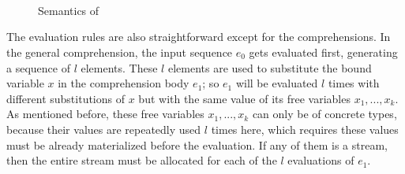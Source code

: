 \begin{figure}\large

	\\[4ex]
	\PT{
		\Axiom{\Eval{\rho}{\{\}\tau}{\{\}}}
	}\\[4ex]
	\\[4ex]
	\\[4ex]
	
	\\[4ex]	
	\\[4ex]
	\\[4ex]
	\\
\caption{Semantics of \mysnesl \label{fig:mysnesl-semantics}}
\end{figure}

The evaluation rules are also straightforward except for the comprehensions.
In the general comprehension, the input sequence $e_0$ gets evaluated first, generating a sequence of $l$ elements.
These $l$ elements are used to substitute the bound variable $x$ in the comprehension body $e_1$; so $e_1$ will be evaluated $l$ times with different substitutions of $x$ but with the same value of its free variables $x_1,...,x_k$.
As mentioned before, these free variables $x_1,..., x_k$ can only be of concrete types, because their values are repeatedly used $l$ times here, which requires these values must be already materialized before the evaluation. 
If any of them is a stream, then the entire stream must be allocated for each of the $l$ evaluations of $e_1$.


